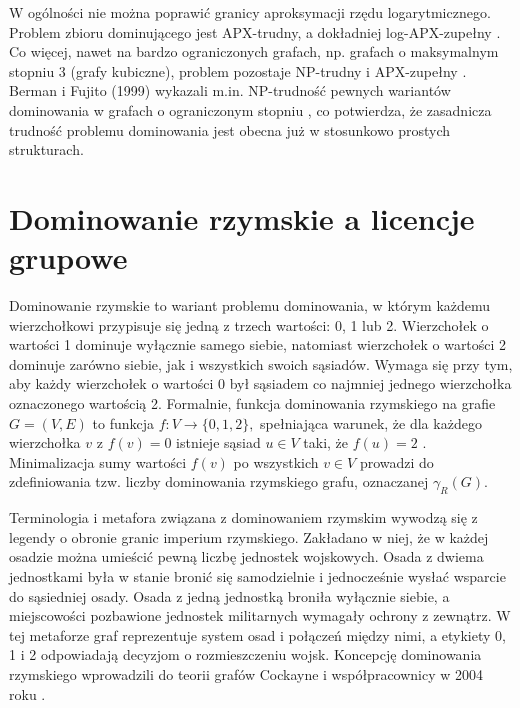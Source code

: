 W ogólności nie można poprawić granicy aproksymacji rzędu logarytmicznego. Problem zbioru dominującego jest APX-trudny, a dokładniej log-APX-zupełny \cite{POUREIDI2023106363}. Co więcej, nawet na bardzo ograniczonych grafach, np. grafach o maksymalnym stopniu 3 (grafy kubiczne), problem pozostaje NP-trudny i APX-zupełny \cite{ALIMONTI2000123}. Berman i Fujito (1999) wykazali m.in. NP-trudność pewnych wariantów dominowania w grafach o ograniczonym stopniu \cite{BermanFujitoThreeDegree}, co potwierdza, że zasadnicza trudność problemu dominowania jest obecna już w stosunkowo prostych strukturach.


\section{Dominowanie rzymskie a licencje grupowe}

Dominowanie rzymskie to wariant problemu dominowania, w którym każdemu wierzchołkowi przypisuje się jedną z trzech wartości: 0, 1 lub 2. Wierzchołek o wartości 1 dominuje wyłącznie samego siebie, natomiast wierzchołek o wartości 2 dominuje zarówno siebie, jak i wszystkich swoich sąsiadów. Wymaga się przy tym, aby każdy wierzchołek o wartości 0 był sąsiadem co najmniej jednego wierzchołka oznaczonego wartością 2. Formalnie, funkcja dominowania rzymskiego na grafie $G=(V,E)$ to funkcja $f: V \to \{0,1,2\},$ spełniająca warunek, że dla każdego wierzchołka $v$ z $f(v) = 0$ istnieje sąsiad $u \in V$ taki, że $f(u) = 2$ \cite{Favaron2009}. Minimalizacja sumy wartości $f(v)$ po wszystkich $v \in V$ prowadzi do zdefiniowania tzw. liczby dominowania rzymskiego grafu, oznaczanej $\gamma_R(G)$.

Terminologia i metafora związana z dominowaniem rzymskim wywodzą się z legendy o obronie granic imperium rzymskiego. Zakładano w niej, że w każdej osadzie można umieścić pewną liczbę jednostek wojskowych. Osada z dwiema jednostkami była w stanie bronić się samodzielnie i jednocześnie wysłać wsparcie do sąsiedniej osady. Osada z jedną jednostką broniła wyłącznie siebie, a miejscowości pozbawione jednostek militarnych wymagały ochrony z zewnątrz. W tej metaforze graf reprezentuje system osad i połączeń między nimi, a etykiety 0, 1 i 2 odpowiadają decyzjom o rozmieszczeniu wojsk. Koncepcję dominowania rzymskiego wprowadzili do teorii grafów Cockayne i współpracownicy w 2004 roku \cite{Cockayne2004}.


